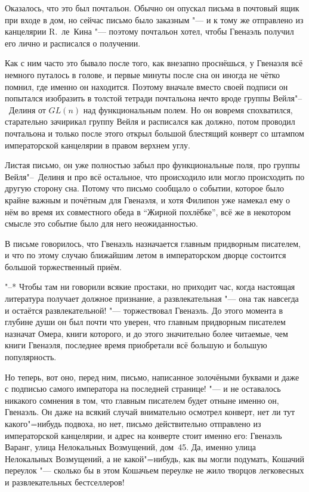 Оказалось, что это был почтальон.
Обычно он опускал письма в почтовый ящик при входе в дом, но сейчас письмо было
заказным "--- и к тому же отправлено из канцелярии R.~ле~Кина "--- поэтому
почтальон хотел, чтобы Гвенаэль получил его лично и расписался о получении.

Как с ним часто это бывало после того, как внезапно проснёшься, у Гвенаэля всё
немного путалось в голове, и первые минуты после сна он иногда не чётко помнил,
где именно он находится.
Поэтому вначале вместо своей подписи он попытался изобразить в толстой тетради
почтальона нечто вроде группы Вейля"--~Делиня от $GL(n)$ над функциональным
полем.
Но он вовремя спохватился, старательно зачирикал группу Вейля и расписался как
должно, потом проводил почтальона и только после этого открыл большой блестящий
конверт со штампом императорской канцелярии в правом верхнем углу.

Листая письмо, он уже полностью забыл про функциональные поля, про группы
Вейля"--~Делиня и про всё остальное, что происходило или могло происходить по
другую сторону сна.
Потому что письмо сообщало о событии, которое было крайне важным и почётным для
Гвенаэля, и хотя Филипон уже намекал ему о нём во время их совместного обеда в
\enquote{Жирной похлёбке}, всё же в некотором смысле это событие было для него
неожиданностью.

В письме говорилось, что Гвенаэль назначается главным придворным писателем, и
что по этому случаю ближайшим летом в императорском дворце состоится большой
торжественный приём.

"--* Чтобы там ни говорили всякие простаки, но приходит час, когда настоящая
литература получает должное признание, а развлекательная "--- она так навсегда
и остаётся развлекательной! "--- торжествовал Гвенаэль.
До этого момента в глубине души он был почти что уверен, что главным придворным
писателем назначат Омера, книги которого, и до этого значительно более читаемые,
чем книги Гвенаэля, последнее время приобретали всё большую и большую
популярность.

Но теперь, вот оно, перед ним, письмо, написанное золочёными буквами и даже с
подписью самого императора на последней странице! "--- и не оставалось никакого
сомнения в том, что главным писателем будет отныне именно он, Гвенаэль.
Он даже на всякий случай внимательно осмотрел конверт, нет ли тут какого"=нибудь
подвоха, но нет, письмо действительно отправлено из императорской канцелярии, и
адрес на конверте стоит именно его: Гвенаэль Варанг, улица Нелокальных
Возмущений, дом~45.
Да, именно улица Нелокальных Возмущений, а не какой"=нибудь, как вы могли
подумать, Кошачий переулок "--- сколько бы в этом Кошачьем переулке не жило
творцов легковесных и развлекательных бестселлеров!

